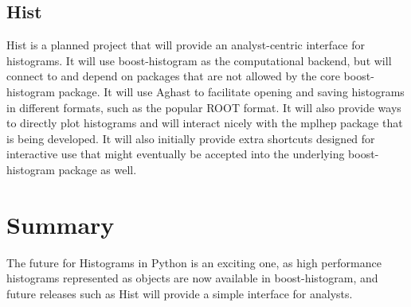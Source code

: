 \documentclass{webofc}
\begin{document}
\subsection{Hist}
\label{sec-hist}

Hist is a planned project that will provide an analyst-centric interface for histograms. It will use boost-histogram as the computational backend, but will connect to and depend on packages that are not allowed by the core boost-histogram package. It will use Aghast to facilitate opening and saving histograms in different formats, such as the popular ROOT format. It will also provide ways to directly plot histograms and will interact nicely with the mplhep package that is being developed. It will also initially provide extra shortcuts designed for interactive use that might eventually be accepted into the underlying boost-histogram package as well.


\section{Summary}
\label{sec-4}


The future for Histograms in Python is an exciting one, as high performance histograms represented as objects are now available in boost-histogram, and future releases such as Hist will provide a simple interface for analysts.


\end{document}
